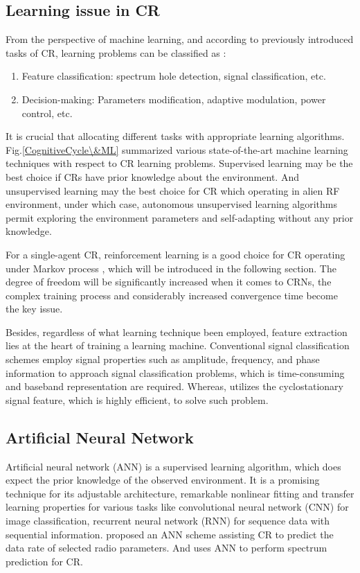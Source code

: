 \documentclass[journal]{IEEEtran}
\begin{document}
\subsection{Learning issue in CR}
From the perspective of machine learning, and according to previously introduced tasks of CR, learning problems can be classified as \cite{bkassiny2013survey}:

\begin{enumerate}
  \item Feature classification: spectrum hole detection, signal classification, etc.
  \item Decision-making: Parameters modification, adaptive modulation, power control, etc.
\end{enumerate}

It is crucial that allocating different tasks with appropriate learning algorithms. Fig.\ref{CognitiveCycle\&ML} summarized various state-of-the-art machine learning techniques with respect to CR learning problems. Supervised learning may be the best choice if CRs have prior knowledge about the environment. And unsupervised learning may the best choice for CR which operating in alien RF environment, under which case, autonomous unsupervised learning algorithms permit exploring the environment parameters and self-adapting without any prior knowledge.

For a single-agent CR, reinforcement learning is a good choice for CR operating under Markov process \cite{bkassiny2011distributed}, which will be introduced in the following section. The degree of freedom will be significantly increased when it comes to CRNs, the complex training process and considerably increased convergence time become the key issue.

Besides, regardless of what learning technique been employed, feature extraction lies at the heart of training a learning machine. Conventional signal classification schemes employ signal properties such as amplitude, frequency, and phase information to approach signal classification problems, which is time-consuming and baseband representation are required. Whereas, \cite{fehske2005new}  utilizes the cyclostationary signal feature, which is highly efficient, to solve such problem.

\subsection{Artificial Neural Network}
Artificial neural network (ANN) is a supervised learning algorithm, which does expect the prior knowledge of the observed environment. It is a promising technique for its adjustable architecture, remarkable nonlinear fitting and transfer learning properties for various tasks like convolutional neural network (CNN) for image classification, recurrent neural network (RNN) for sequence data with sequential information. \cite{tsagkaris2008neural} proposed an ANN scheme assisting CR to predict the data rate of selected radio parameters. And \cite{tumuluru2010neural} uses ANN to perform spectrum prediction for CR.
\end{document}
